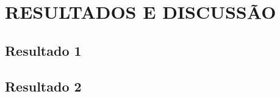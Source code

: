 \chapter{RESULTADOS E DISCUSSÃO}
\label{cap:resultados}




\section{Resultado 1}


\section{Resultado 2}

